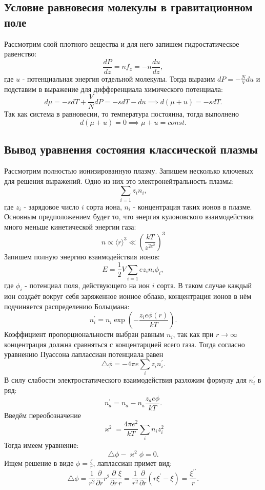 \documentclass[12pt]{article}
\begin{document}
\subsection*{Условие равновесия молекулы в гравитационном поле} \label{app:2}
Рассмотрим слой плотного вещества и для него запишем гидростатическое равенство: 
\[
    \frac{dP}{dz} = n f_z = -n \frac{du}{dz},
\]
где $u$ - потенциальная энергия отдельной молекулы.  
Тогда выразим $dP = -\frac{N}{V} du$ и подставим в выражение для дифференциала химического потенциала: 
\[
    d \mu = -s dT + \frac{V}{N} dP = -s dT - du \implies d (\mu + u) = -s dT. 
\]   
Так как система в равновесии, то температура постоянна, тогда выполнено 
\[
    d(\mu + u) = 0 \implies \mu + u = const.
\]
\subsection*{Вывод уравнения состояния классической плазмы} \label{app:3}
Рассмотрим полностью ионизированную плазму. Запишем несколько ключевых для решения выражений. 
Одно из них это электронейтральность плазмы: 
\[
    \sum_{i=1} z_i n_i, 
\]
где $z_i$ - зарядовое число $i$ сорта иона, $n_i$ - концентрация таких ионов в плазме. 
Основным предположением будет то, что энергия кулоновского взаимодействия много меньше кинетической энергии газа: 
\[
    n \propto \langle r \rangle^3 \ll \left( \frac{kT}{z^{2e^2} } \right)^3
\]
Запишем полную энергию взаимодействия ионов: 
\[
    E = \frac{1}{2} V \sum_{i=1} e z_i n_i \phi_i, 
\]
где $\phi_i$ - потенциал поля, действующего на ион $i$ сорта. 
В таком случае каждый ион создаёт вокруг себя заряженное ионное облако, 
концентрация ионов в нём подчиняется распределению Больцмана: 
\[
    n_i^{\prime} = n_i \exp \left( -\frac{z_i e \phi(r)}{kT} \right). 
\]
Коэффициент пропорциональности выбран равным $n_i$, так как при $r \to \infty$ концентрация должна сравняться 
с концентарцией всего газа. 
Тогда согласно уравнению Пуассона лаплассиан потенциала равен 
\[
    \triangle \phi = - 4\pi e \sum_{i} z_i n_i^{\prime}.
\]
В силу слабости электростатического взаимодействия разложим формулу для $n_i^{\prime}$ в ряд: 
\[
    n_a^{\prime} = n_a - n_a \frac{z_a e \phi}{kT}.
\] 
Введём переобозначение
\[
    \varkappa^2 = \frac{4\pi e^2}{kT} \sum_{i} n_i z_i^2
\] 
Тогда имеем уравнение: 
\[
    \triangle \phi - \varkappa^2 \phi = 0. 
\]
Ищем решение в виде $\phi = \frac{\xi}{r}$, лаплассиан примет вид: 
\[
    \triangle \phi = \frac{1}{r^2} \frac{\partial}{\partial r} r^2 \frac{\partial}{\partial r} \frac{\xi}{r} = \frac{1}{r^2} \frac{\partial}{\partial r} (r \xi^{\prime} - \xi) = \frac{\xi^{\prime\prime}}{r}. 
\] 
\end{document}

